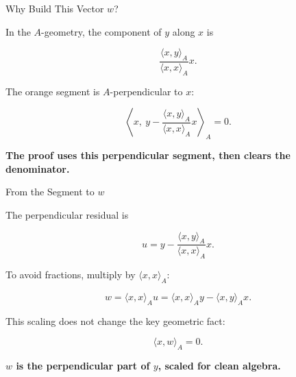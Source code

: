 \documentclass[10pt]{beamer}
\theoremstyle{definition}
\newcommand{\x}[1]{\alert{\textbf{#1}}}
\begin{document}
\begin{frame}[shrink=6]{Why Build This Vector $w$?}

In the $A$-geometry, the component of $y$ along $x$ is

$$
\frac{\langle x,y\rangle_A}{\langle x,x\rangle_A}x.
$$

\vfill

\begin{center}
\end{center}

\vfill

The orange segment is $A$-perpendicular to $x$:

$$
\left\langle x,\ y-\frac{\langle x,y\rangle_A}{\langle x,x\rangle_A}x\right\rangle_A=0.
$$

\begin{center}
\x{The proof uses this perpendicular segment, then clears the denominator.}
\end{center}

\end{frame}


\begin{frame}[shrink=6]{From the Segment to $w$}

The perpendicular residual is

$$
u=y-\frac{\langle x,y\rangle_A}{\langle x,x\rangle_A}x.
$$

\vfill

To avoid fractions, multiply by $\langle x,x\rangle_A$:

$$
\boxed{
w=\langle x,x\rangle_Au
=\langle x,x\rangle_Ay-\langle x,y\rangle_Ax.
}
$$

\vfill

This scaling does not change the key geometric fact:

$$
\langle x,w\rangle_A=0.
$$

\vfill

\begin{center}
\x{$w$ is the perpendicular part of $y$, scaled for clean algebra.}
\end{center}

\end{frame}
\end{document}

